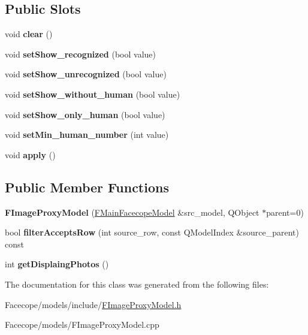 \subsection*{Public Slots}
\begin{DoxyCompactItemize}
\item 
\mbox{\label{classFImageProxyModel_a5a10355cb8221903eb2c008d8d6757b2}} 
void {\bfseries clear} ()
\item 
\mbox{\label{classFImageProxyModel_ae34e7bb126cbc6d36214655a80e1246f}} 
void {\bfseries set\+Show\+\_\+recognized} (bool value)
\item 
\mbox{\label{classFImageProxyModel_ad6908944746afd07f2caf0d1f665db85}} 
void {\bfseries set\+Show\+\_\+unrecognized} (bool value)
\item 
\mbox{\label{classFImageProxyModel_ae9db9cd4784521a8384351d8b330ec4d}} 
void {\bfseries set\+Show\+\_\+without\+\_\+human} (bool value)
\item 
\mbox{\label{classFImageProxyModel_aef7f4ed60085955e6264cbfdbbd49b41}} 
void {\bfseries set\+Show\+\_\+only\+\_\+human} (bool value)
\item 
\mbox{\label{classFImageProxyModel_a3e65daf7d2cc0115bac7e7920c91df9e}} 
void {\bfseries set\+Min\+\_\+human\+\_\+number} (int value)
\item 
\mbox{\label{classFImageProxyModel_a8a29d8f0b3ac2a9693d3ca47f718151e}} 
void {\bfseries apply} ()
\end{DoxyCompactItemize}
\subsection*{Public Member Functions}
\begin{DoxyCompactItemize}
\item 
\mbox{\label{classFImageProxyModel_a00dd19eaa241d81f83b5d827049b4ba8}} 
{\bfseries F\+Image\+Proxy\+Model} (\hyperlink{classFMainFacecopeModel}{F\+Main\+Facecope\+Model} \&src\+\_\+model, Q\+Object $\ast$parent=0)
\item 
\mbox{\label{classFImageProxyModel_aa684f4c8e2eb18a1ed29e57de9f1c5ba}} 
bool {\bfseries filter\+Accepts\+Row} (int source\+\_\+row, const Q\+Model\+Index \&source\+\_\+parent) const
\item 
\mbox{\label{classFImageProxyModel_aa3fba9a128badc5c4b06a0a4caafa4c2}} 
int {\bfseries get\+Displaing\+Photos} ()
\end{DoxyCompactItemize}


The documentation for this class was generated from the following files\+:\begin{DoxyCompactItemize}
\item 
Facecope/models/include/\hyperlink{FImageProxyModel_8h}{F\+Image\+Proxy\+Model.\+h}\item 
Facecope/models/F\+Image\+Proxy\+Model.\+cpp\end{DoxyCompactItemize}
